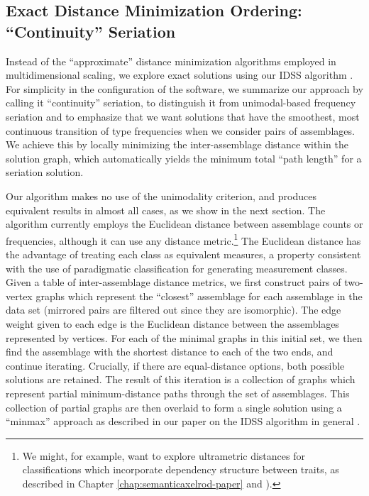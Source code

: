 \subsection{\texorpdfstring{Exact Distance Minimization Ordering:
``Continuity''
Seriation}{Exact Distance Minimization Ordering: Continuity Seriation}}\label{multser:sec:exact-distance-minimization-ordering-continuity-seriation}

Instead of the ``approximate'' distance minimization algorithms employed
in multidimensional scaling, we explore exact solutions using our IDSS
algorithm \citep{Lipo2015}. For simplicity in the configuration of the software, we
summarize our approach by calling it ``continuity'' seriation, to
distinguish it from unimodal-based frequency seriation and to emphasize
that we want solutions that have the smoothest, most continuous
transition of type frequencies when we consider pairs of assemblages. We
achieve this by locally minimizing the inter-assemblage distance within
the solution graph, which automatically yields the minimum total ``path
length'' for a seriation solution.

Our algorithm makes no use of the unimodality criterion, and produces
equivalent results in almost all cases, as we show in the next section.
The algorithm currently employs the Euclidean distance between
assemblage counts or frequencies, although it can use any distance
metric.\footnote{We might, for example, want to explore ultrametric distances for classifications which incorporate 
dependency structure between traits, as described in Chapter \ref{chap:semanticaxelrod-paper} and \citet{mesoudi2008learning}).}  
The Euclidean distance has the advantage of treating each class
as equivalent measures, a property consistent with the use of
paradigmatic classification \citep[sensu][]{Dunnell1971} for generating
measurement classes. Given a table of inter-assemblage distance metrics,
we first construct pairs of two-vertex graphs which represent the
``closest'' assemblage for each assemblage in the data set (mirrored
pairs are filtered out since they are isomorphic). The edge weight given
to each edge is the Euclidean distance between the assemblages
represented by vertices. For each of the minimal graphs in this initial
set, we then find the assemblage with the shortest distance to each of
the two ends, and continue iterating. Crucially, if there are
equal-distance options, both possible solutions are retained. The result
of this iteration is a collection of graphs which represent partial
minimum-distance paths through the set of assemblages. This collection
of partial graphs are then overlaid to form a single solution using a
``minmax'' approach as described in our paper on the IDSS algorithm in
general \citep{Lipo2015}.

